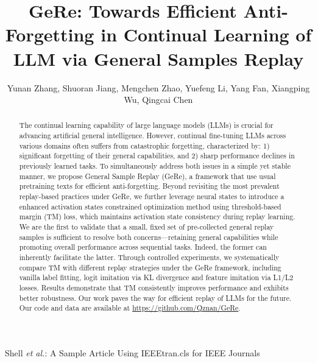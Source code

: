 \documentclass[10pt,journal,compsoc]{IEEEtran}
\begin{document}
\title{GeRe: Towards Efficient Anti-Forgetting in Continual Learning of LLM via General Samples Replay}

\author{
Yunan Zhang, Shuoran Jiang, Mengchen Zhao, Yuefeng Li, Yang Fan, Xiangping Wu, Qingcai Chen  



}

%
{Shell \MakeLowercase{\textit{et al.}}: A Sample Article Using IEEEtran.cls for IEEE Journals}

\maketitle

\begin{abstract}
The continual learning capability of large language models (LLMs) is crucial for advancing artificial general intelligence. However, continual fine-tuning LLMs across various domains often suffers from catastrophic forgetting, characterized by: 1) significant forgetting of their general capabilities, and 2) sharp performance declines in previously learned tasks.
To simultaneously address both issues in a simple yet stable manner, we propose General Sample Replay (GeRe), a framework that use usual pretraining texts for efficient anti-forgetting. Beyond revisiting the most prevalent replay-based practices under GeRe, we further leverage neural states to introduce a enhanced activation states constrained optimization method using threshold-based margin (TM) loss, which maintains activation state consistency during replay learning.
We are the first to validate that a small, fixed set of pre-collected general replay samples is sufficient to resolve both concerns---retaining general capabilities while promoting overall performance across sequential tasks.
Indeed, the former can inherently facilitate the latter.
Through controlled experiments, we systematically compare TM with different replay strategies under the GeRe framework, including vanilla label fitting, logit imitation via KL divergence and feature imitation via L1/L2 losses. Results demonstrate that TM consistently improves performance and exhibits better robustness. Our work paves the way for efficient replay of LLMs for the future.
Our code and data are available at \url{https://github.com/Qznan/GeRe}.

\end{abstract}
\end{document}
